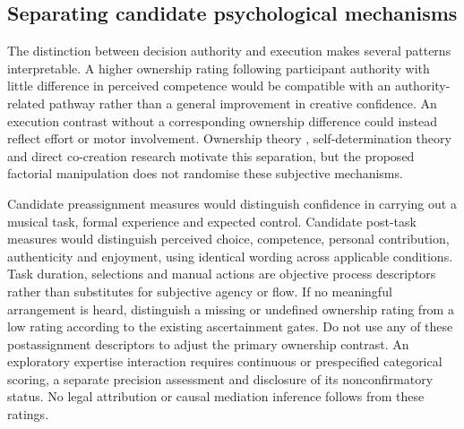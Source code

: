 \documentclass[11pt]{article}
\begin{document}
\subsection{Separating candidate psychological mechanisms}
The distinction between decision authority and execution makes several patterns interpretable. A higher ownership rating following participant authority with little difference in perceived competence would be compatible with an authority-related pathway rather than a general improvement in creative confidence. An execution contrast without a corresponding ownership difference could instead reflect effort or motor involvement. Ownership theory \citep{pierce2001,pierce2003}, self-determination theory \citep{deci2000} and direct co-creation research \citep{he2026} motivate this separation, but the proposed factorial manipulation does not randomise these subjective mechanisms.

Candidate preassignment measures would distinguish confidence in carrying out a musical task, formal experience and expected control. Candidate post-task measures would distinguish perceived choice, competence, personal contribution, authenticity and enjoyment, using identical wording across applicable conditions. Task duration, selections and manual actions are objective process descriptors rather than substitutes for subjective agency or flow. If no meaningful arrangement is heard, distinguish a missing or undefined ownership rating from a low rating according to the existing ascertainment gates. Do not use any of these postassignment descriptors to adjust the primary ownership contrast. An exploratory expertise interaction requires continuous or prespecified categorical scoring, a separate precision assessment and disclosure of its nonconfirmatory status. No legal attribution or causal mediation inference follows from these ratings.
\end{document}
